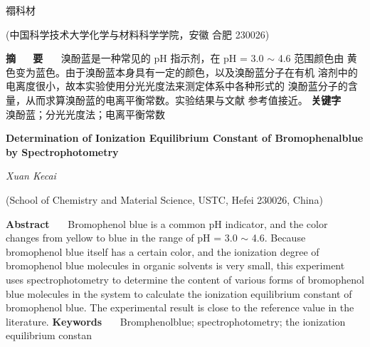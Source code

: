 \documentclass[12pt]{ctexart}
\numberwithin{equation}{section}
\begin{document}
\nocite{*}

\begin{center}
    \heiti {}

    \vspace{12pt}

    \kaishu \fontsize{13.75pt}{0}禤科材
    


    \vspace{5pt}

    \songti \fontsize{12pt}{0}(中国科学技术大学化学与材料科学学院，安徽 合肥 230026)
\end{center}

\noindent\textbf{摘~~~\!要}~~~\!
溴酚蓝是一种常见的 pH 指示剂，在 pH = 3.0 $\sim$ 4.6 范围颜色由
黄色变为蓝色。由于溴酚蓝本身具有一定的颜色，以及溴酚蓝分子在有机
溶剂中的电离度很小，故本实验使用分光光度法来测定体系中各种形式的
溴酚蓝分子的含量，从而求算溴酚蓝的电离平衡常数。实验结果与文献
参考值接近。
\newline
\textbf{关键字}~~~\!
溴酚蓝；分光光度法；电离平衡常数

\begin{center}
    {\LARGE\rmfamily\textbf{Determination of Ionization Equilibrium Constant of Bromophenalblue by Spectrophotometry}}

    \vspace{12pt}

    {\slshape Xuan Kecai}

    \vspace{5pt}

    (School of Chemistry and Material Science, USTC, Hefei 230026, China)
\end{center}

\noindent\textbf{Abstract}~~~\!
Bromophenol blue is a common pH indicator, and the color
changes from yellow to blue in the range of pH = 3.0 $\sim$
4.6. Because bromophenol blue itself has a certain color,
and the ionization degree of bromophenol blue molecules in
organic solvents is very small, this experiment uses
spectrophotometry to determine the content of various forms
of bromophenol blue molecules in the system to calculate
the ionization equilibrium constant of bromophenol blue.
The experimental result is close to the reference value in
the literature.
\newline
\textbf{Keywords}~~~\!
Bromphenolblue; spectrophotometry; the ionization
equilibrium constan
\end{document}
